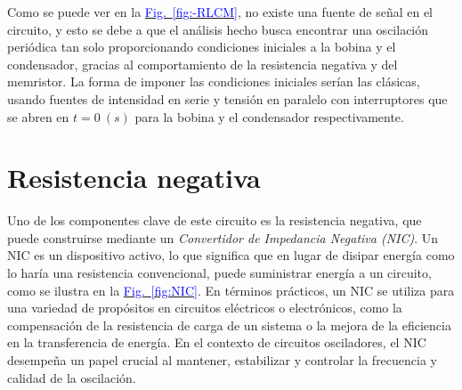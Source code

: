 \documentclass[12pt,a4paper]{report} %
\newcommand{\fref}[1]{\hyperref[#1]{\textcolor{blue}{Fig.~\ref*{#1}}}}
\begin{document}
	\vspace{0.5cm}Como se puede ver en la \fref{fig:-RLCM}, no existe una fuente de señal en el circuito, y esto se debe a que el análisis hecho busca encontrar una oscilación periódica tan solo proporcionando condiciones iniciales a la bobina y el condensador, gracias al comportamiento de la resistencia negativa y del memristor. La forma de imponer las condiciones iniciales serían las clásicas, usando fuentes de intensidad en serie y tensión en paralelo con interruptores que se abren en $t=0\:(s)$ para la bobina y el condensador respectivamente.
	
	\newpage
	
	\section{Resistencia negativa}
	
	 Uno de los componentes clave de este circuito es la resistencia negativa, que puede construirse mediante un \textit{Convertidor de Impedancia Negativa (NIC)}. Un NIC es un dispositivo activo, lo que significa que en lugar de disipar energía como lo haría una resistencia convencional, puede suministrar energía a un circuito, como se ilustra en la \fref{fig:NIC}. En términos prácticos, un NIC se utiliza para una variedad de propósitos en circuitos eléctricos o electrónicos, como la compensación de la resistencia de carga de un sistema o  la mejora de la eficiencia en la transferencia de energía. En el contexto de circuitos osciladores, el NIC desempeña un papel crucial al mantener, estabilizar y controlar la frecuencia y calidad de la oscilación.
	 
\end{document}
